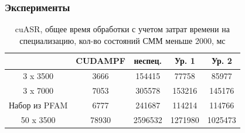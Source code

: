 \documentclass{beamer}
\newcommand\name[1]{\textsc{#1}}
\newcommand{\backupend}{
   \setcounter{framenumber}{\value{finalframe}}
}
\begin{document}
\begin{frame}[fragile]
	\frametitle{Эксперименты}
\begin{table}[h!]
  \centering
  \begin{tabular}{||c c c c c||} 
    \hline
    & CUDAMPF & неспец. & Ур. 1 & Ур. 2\\ [0.5ex] 
    \hline\hline
    3 x 3500 & 3666 & 154415 & 77758 & 85977 \\ 
    \hline
    3 x 7000 & 7053 & 305578 & 153216 & 145176 \\
    \hline
    Набор из \name{PFAM} & 6777 & 241687 & 114214 & 114766 \\
    \hline
    50 x 3500 & 78930 & 2596532 & 1271980 & 1025473 \\
    \hline
  \end{tabular}
  \caption{cuASR, общее время обработки с учетом затрат времени на специализацию, кол-во состояний СММ меньше 2000, мс}
  \label{runtime_CUSP}
\end{table}
\end{frame}

\backupend
\end{document}
